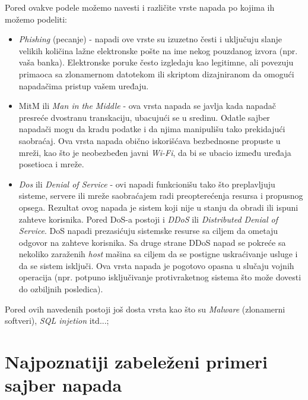 \documentclass[a4paper]{article}
\begin{document}
{Pored ovakve podele možemo navesti i različite vrste napada po kojima ih možemo podeliti:
\begin{itemize}
    \item \emph{Phishing} (pecanje) - napadi ove vrste su izuzetno česti i uključuju slanje velikih količina lažne elektronske pošte na ime nekog pouzdanog izvora (npr. vaša banka). Elektronske poruke često izgledaju kao legitimne, ali povezuju primaoca sa zlonamernom datotekom ili skriptom dizajniranom da omogući napadačima pristup vašem uređaju.
    \item MitM ili \emph{Man in the Middle} - ova vrsta napada se javlja kada napadač presreće dvostranu transkaciju, ubacujući se u sredinu. Odatle sajber napadači mogu da kradu podatke i da njima manipulišu tako prekidajući saobraćaj. Ova vrsta napada obično iskorišćava bezbednosne propuste u mreži, kao što je neobezbeđen javni \emph{Wi-Fi}, da bi se ubacio između uređaja posetioca i mreže.
    \item \emph{Dos} ili \emph{Denial of Service} - ovi napadi funkcionišu tako što preplavljuju sisteme, servere ili mreže saobraćajem radi preopterećenja resursa i propusnog opsega. Rezultat ovog napada je sistem koji nije u stanju da obradi ili ispuni zahteve korisnika.
    Pored DoS-a postoji i \emph{DDoS}  ili \emph{Distributed Denial of Service}. DoS napadi prezasićuju sistemske resurse sa ciljem da ometaju odgovor na zahteve korisnika. Sa druge strane DDoS napad se pokreće sa nekoliko zaraženih \emph{host} mašina sa ciljem da se postigne uskraćivanje usluge i da se sistem isključi. Ova vrsta napada je pogotovo opasna u slučaju vojnih operacija (npr. potpuno isključivanje protivraketnog sistema što može dovesti do ozbiljnih posledica).
\end{itemize}    
Pored ovih navedenih postoji još dosta vrsta kao što su \emph{Malware} (zlonamerni softveri), \emph{SQL injetion} itd...;






\section{Najpoznatiji zabeleženi primeri sajber napada}
\label{sec:naslovM}



}
\end{document}
